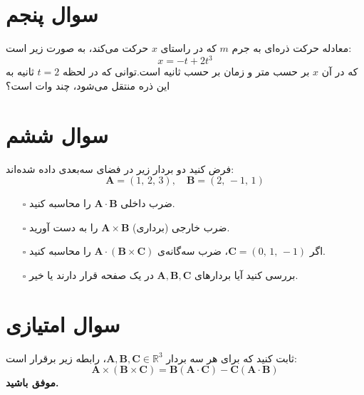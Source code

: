 \documentclass[a4paper,16pt]{article}
\begin{document}
	\section{سوال پنجم}
	
	معادله حرکت ذره‌ای به جرم $m$ که در راستای $x$ حرکت می‌کند، به صورت زیر است:
	\[
	x =-t+2t^{3}
	\]
	که در آن $x$ بر حسب متر و زمان بر حسب ثانیه است.توانی که در لحظه $t = 2$ ثانیه به این ذره منتقل می‌شود، چند وات است؟
	\section{سوال ششم}
فرض کنید دو بردار زیر در فضای سه‌بعدی داده شده‌اند:
\[
\mathbf{A} = (1,\,2,\,3) , \quad \mathbf{B} = (2,\, -1,\, 1)
\]

\begin{itemize}
	\item[$\square$]ضرب داخلی \(\mathbf{A} \cdot \mathbf{B}\) را محاسبه کنید.  
	\item[$\square$] ضرب خارجی (برداری) \(\mathbf{A} \times \mathbf{B}\) را به دست آورید.  
	\item[$\square$]اگر \(\mathbf{C} = (0,\,1,\, -1)\)، ضرب سه‌گانه‌ی \(\mathbf{A} \cdot (\mathbf{B} \times \mathbf{C})\) را محاسبه کنید.  
	\item[$\square$] بررسی کنید آیا بردارهای \(\mathbf{A}, \mathbf{B}, \mathbf{C}\) در یک صفحه قرار دارند یا خیر.  
\end{itemize}
\section{سوال امتیازی}

ثابت کنید که برای هر سه بردار $\mathbf{A},\mathbf{B},\mathbf{C}\in\mathbb{R}^3$، رابطه زیر برقرار است:
\[
\boxed{\;\mathbf{A}\times(\mathbf{B}\times\mathbf{C})
	=\mathbf{B}(\mathbf{A}\cdot\mathbf{C})-\mathbf{C}(\mathbf{A}\cdot\mathbf{B})\;}
\]
	\vspace{10pt}
\textbf{موفق باشید.}
\end{document}
